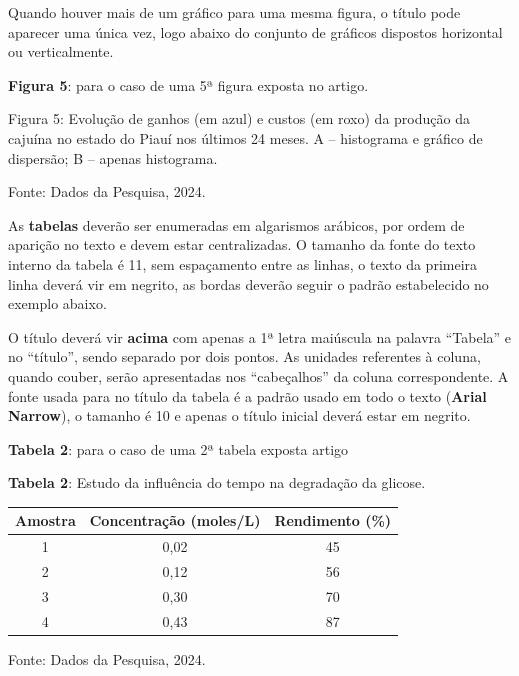 Quando houver mais de um gráfico para uma mesma figura, o título pode aparecer uma única vez, logo abaixo do conjunto de gráficos dispostos horizontal ou verticalmente.

\textbf{Figura 5}: para o caso de uma 5ª figura exposta no artigo.

Figura 5: Evolução de ganhos (em azul) e custos (em roxo) da produção da cajuína no estado do Piauí nos últimos 24 meses. A – histograma e gráfico de dispersão; B – apenas histograma.

\begin{figure}[htb]
    \centering
    \fbox{\rule{0pt}{2in} \rule{0.6\textwidth}{0pt}}
\end{figure}

Fonte: Dados da Pesquisa, 2024.

As \textbf{tabelas} deverão ser enumeradas em algarismos arábicos, por ordem de aparição no texto e devem estar centralizadas. O tamanho da fonte do texto interno da tabela é 11, sem espaçamento entre as linhas, o texto da primeira linha deverá vir em negrito, as bordas deverão seguir o padrão estabelecido no exemplo abaixo.

O título deverá vir \textbf{acima} com apenas a 1ª letra maiúscula na palavra ``Tabela'' e no ``título'', sendo separado por dois pontos. As unidades referentes à coluna, quando couber, serão apresentadas nos ``cabeçalhos'' da coluna correspondente. A fonte usada para no título da tabela é a padrão usado em todo o texto (\textbf{Arial Narrow}), o tamanho é 10 e apenas o título inicial deverá estar em negrito.

\textbf{Tabela 2}: para o caso de uma 2ª tabela exposta artigo

\textbf{Tabela 2}: Estudo da influência do tempo na degradação da glicose.

\begin{table}[htb]
    \centering
    \begin{tabular}{ccc}
        \toprule
        \textbf{Amostra} & \textbf{Concentração (moles/L)} & \textbf{Rendimento (\%)} \\
        \midrule
        1 & 0,02 & 45 \\
        2 & 0,12 & 56 \\
        3 & 0,30 & 70 \\
        4 & 0,43 & 87 \\
        \bottomrule
    \end{tabular}
    
    {\footnotesize Fonte: Dados da Pesquisa, 2024.}
\end{table}

